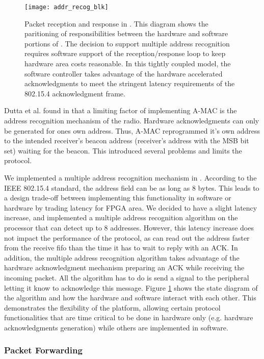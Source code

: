 \begin{figure}[bht]
\centering
\texttt{[image: addr\_recog\_blk]}
\caption{Packet reception and response in \sdr. This diagram shows the
paritioning of responsibilities between the hardware and software portions of
\sdr. The decision to support multiple address recognition requires software
support of the reception/response loop to keep hardware area costs reasonable.
In this tightly coupled model, the software controller takes advantage of the
hardware accelerated acknowledgments to meet the stringent latency
requirements of the 802.15.4 acknowledgment frame.}
\label{fig:addr_blk}
\end{figure}

Dutta et al. found in \cite{2010.amac} that a limiting factor of implementing
A-MAC is the address recognition mechanism of the radio. Hardware
acknowledgments can only be generated for ones own address. Thus, A-MAC
reprogrammed it's own address to the intended receiver's beacon address
(receiver's address with the MSB bit set) waiting for the beacon. This
introduced several problems and limits the protocol.

We implemented a multiple address recognition mechanism in \sdr. According to
the IEEE 802.15.4 standard, the address field can be as long as 8 bytes. This
leads to a design trade-off between implementing this functionality in
software or hardware by trading latency for FPGA area. We decided to have a
slight latency increase, and implemented a multiple address recognition
algorithm on the processor that can detect up to 8 addresses. However, this
latency increase does not impact the performance of the protocol, as \sdr can
read out the address faster from the receive fifo than the time it has to wait
to reply with an ACK. In addition, the multiple address recognition algorithm
takes advantage of the hardware acknowledgment mechanism preparing an ACK
while receiving the incoming packet. All the algorithm has to do is send a
signal to the peripheral letting it know to acknowledge this message.  Figure
\ref{fig:addr_blk} shows the state diagram of the algorithm and how the
hardware and software interact with each other. This demonstrates the
flexibility of the platform, allowing certain protocol functionalities that
are time critical to be done in hardware only (e.g.  hardware acknowledgments
generation) while others are implemented in software.


\subsubsection{Packet Forwarding}\label{subsec:forward}

